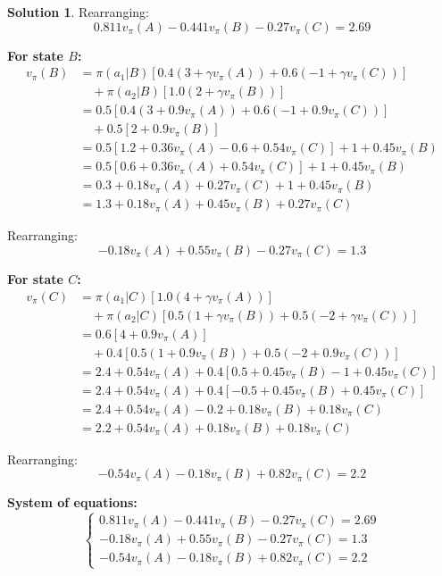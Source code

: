 \documentclass[11pt]{article}
\theoremstyle{definition}
\newtheorem*{solution}{Solution}
\begin{document}
\begin{solution}
Rearranging:
\[
0.811v_\pi(A) - 0.441v_\pi(B) - 0.27v_\pi(C) = 2.69
\]

\textbf{For state $B$:}
\begin{align*}
v_\pi(B) &= \pi(a_1|B)[0.4(3 + \gamma v_\pi(A)) + 0.6(-1 + \gamma v_\pi(C))] \\
         &\quad + \pi(a_2|B)[1.0(2 + \gamma v_\pi(B))] \\
         &= 0.5[0.4(3 + 0.9v_\pi(A)) + 0.6(-1 + 0.9v_\pi(C))] \\
         &\quad + 0.5[2 + 0.9v_\pi(B)] \\
         &= 0.5[1.2 + 0.36v_\pi(A) - 0.6 + 0.54v_\pi(C)] + 1 + 0.45v_\pi(B) \\
         &= 0.5[0.6 + 0.36v_\pi(A) + 0.54v_\pi(C)] + 1 + 0.45v_\pi(B) \\
         &= 0.3 + 0.18v_\pi(A) + 0.27v_\pi(C) + 1 + 0.45v_\pi(B) \\
         &= 1.3 + 0.18v_\pi(A) + 0.45v_\pi(B) + 0.27v_\pi(C)
\end{align*}

Rearranging:
\[
-0.18v_\pi(A) + 0.55v_\pi(B) - 0.27v_\pi(C) = 1.3
\]

\textbf{For state $C$:}
\begin{align*}
v_\pi(C) &= \pi(a_1|C)[1.0(4 + \gamma v_\pi(A))] \\
         &\quad + \pi(a_2|C)[0.5(1 + \gamma v_\pi(B)) + 0.5(-2 + \gamma v_\pi(C))] \\
         &= 0.6[4 + 0.9v_\pi(A)] \\
         &\quad + 0.4[0.5(1 + 0.9v_\pi(B)) + 0.5(-2 + 0.9v_\pi(C))] \\
         &= 2.4 + 0.54v_\pi(A) + 0.4[0.5 + 0.45v_\pi(B) - 1 + 0.45v_\pi(C)] \\
         &= 2.4 + 0.54v_\pi(A) + 0.4[-0.5 + 0.45v_\pi(B) + 0.45v_\pi(C)] \\
         &= 2.4 + 0.54v_\pi(A) - 0.2 + 0.18v_\pi(B) + 0.18v_\pi(C) \\
         &= 2.2 + 0.54v_\pi(A) + 0.18v_\pi(B) + 0.18v_\pi(C)
\end{align*}

Rearranging:
\[
-0.54v_\pi(A) - 0.18v_\pi(B) + 0.82v_\pi(C) = 2.2
\]

\textbf{System of equations:}
\[
\begin{cases}
0.811v_\pi(A) - 0.441v_\pi(B) - 0.27v_\pi(C) = 2.69 \\
-0.18v_\pi(A) + 0.55v_\pi(B) - 0.27v_\pi(C) = 1.3 \\
-0.54v_\pi(A) - 0.18v_\pi(B) + 0.82v_\pi(C) = 2.2
\end{cases}
\]


\end{solution}
\end{document}
